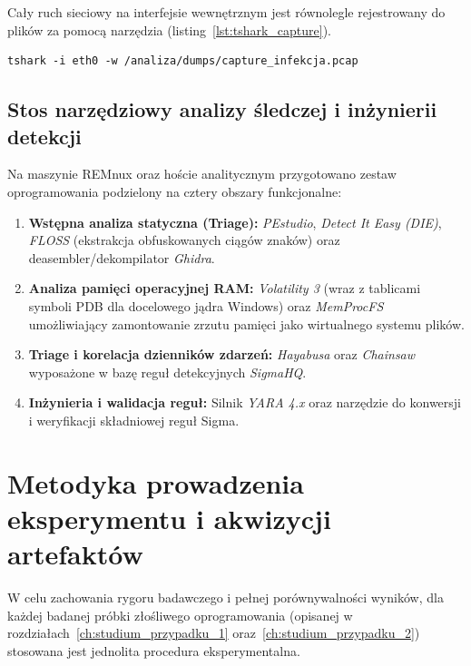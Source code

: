 Cały ruch sieciowy na interfejsie wewnętrznym jest równolegle rejestrowany do plików  za pomocą narzędzia  (listing~\ref{lst:tshark_capture}).

\begin{lstlisting}[style=terminal, caption={Uruchomienie pełnego przechwytywania pakietów na interfejsie laboratoryjnym}, label={lst:tshark_capture}]
tshark -i eth0 -w /analiza/dumps/capture_infekcja.pcap
\end{lstlisting}

\subsection{Stos narzędziowy analizy śledczej i inżynierii detekcji}\label{subsec:stos_narzedziowy}

Na maszynie REMnux oraz hoście analitycznym przygotowano zestaw oprogramowania podzielony na cztery obszary funkcjonalne:
\begin{enumerate}
    \item \textbf{Wstępna analiza statyczna (Triage):} \textit{PEstudio}, \textit{Detect It Easy (DIE)}, \textit{FLOSS} (ekstrakcja obfuskowanych ciągów znaków) oraz deasembler/dekompilator \textit{Ghidra}.
    \item \textbf{Analiza pamięci operacyjnej RAM:} \textit{Volatility 3} (wraz z tablicami symboli PDB dla docelowego jądra Windows) oraz \textit{MemProcFS} umożliwiający zamontowanie zrzutu pamięci jako wirtualnego systemu plików.
    \item \textbf{Triage i korelacja dzienników zdarzeń:} \textit{Hayabusa} oraz \textit{Chainsaw} wyposażone w bazę reguł detekcyjnych \textit{SigmaHQ}.
    \item \textbf{Inżynieria i walidacja reguł:} Silnik \textit{YARA 4.x} oraz narzędzie  do konwersji i weryfikacji składniowej reguł Sigma.
\end{enumerate}

\section{Metodyka prowadzenia eksperymentu i akwizycji artefaktów}\label{sec:metodyka_akwizycji}

W celu zachowania rygoru badawczego i pełnej porównywalności wyników, dla każdej badanej próbki złośliwego oprogramowania (opisanej w rozdziałach~\ref{ch:studium_przypadku_1} oraz~\ref{ch:studium_przypadku_2}) stosowana jest jednolita procedura eksperymentalna.

